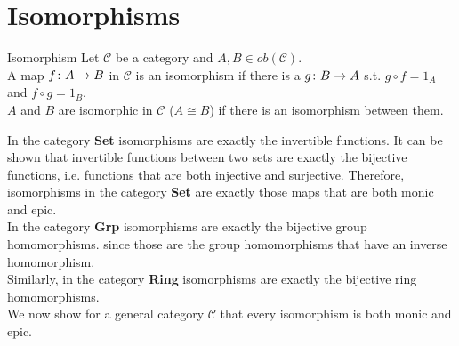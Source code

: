 \section {Isomorphisms}
\begin{definition}{Isomorphism}
  Let $\mathscr{C}$ be a category and $A, B \in ob(\mathscr{C})$.
  \\ A map $f \from A \to B$ in $\mathscr{C}$ is an isomorphism if there is a $g \from B \to A$ s.t. $g \circ f = 1_A$ and $f \circ g = 1_B$.
  \\ $A$ and $B$ are isomorphic in $\mathscr{C}$ ($A \cong B$) if there is an isomorphism between them.
\end{definition}

In the category \textbf{Set} isomorphisms are exactly the invertible functions. It can be shown that invertible functions between two sets are
exactly the bijective functions, i.e. functions that are both injective and surjective.
Therefore, isomorphisms in the category \textbf{Set} are exactly those maps that are both monic and epic.\\
In the category \textbf{Grp} isomorphisms are exactly the bijective group homomorphisms.
since those are the group homomorphisms that have an inverse homomorphism.\\
Similarly, in the category \textbf{Ring} isomorphisms are exactly the bijective ring homomorphisms.\\[1mm]
We now show for a general category $\mathscr{C}$ that every isomorphism is both monic and epic.
